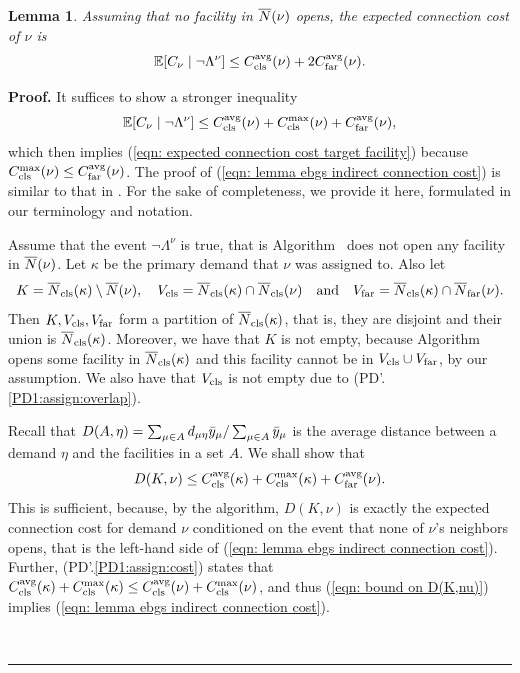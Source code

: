 \documentclass[oneside,final]{ucr}
\newtheorem{lemma}[theorem]{Lemma}
\newenvironment{proof}[1][Proof]{\textbf{#1.} }{\ \rule{0.5em}{0.5em}}
\begin{document}
\begin{lemma}\label{lem: EBGS target connection cost}
Assuming that no facility in ${\overline{N}}(\nu)$ opens, the expected connection
cost of $\nu$ is
%
\begin{equation}
  \mathbb{E}[C_{\nu} \mid \neg \Lambda^{\nu}] \leq
  C_{{\mbox{\scriptsize\rm cls}}}^{{\mbox{\scriptsize\rm avg}}}(\nu) + 2C_{{\mbox{\scriptsize\rm far}}}^{{\mbox{\scriptsize\rm avg}}}(\nu).
  \label{eqn: expected connection cost target facility}
\end{equation}
%
\end{lemma}
\begin{proof}
It suffices to show a stronger inequality
\begin{equation}
  \mathbb{E}[C_{\nu} \mid \neg \Lambda^{\nu}] \leq
  C_{{\mbox{\scriptsize\rm cls}}}^{{\mbox{\scriptsize\rm avg}}}(\nu) + C_{{\mbox{\scriptsize\rm cls}}}^{\max}(\nu) + C_{{\mbox{\scriptsize\rm far}}}^{{\mbox{\scriptsize\rm avg}}}(\nu)
			\label{eqn: lemma ebgs indirect connection cost},
\end{equation}
which then implies (\ref{eqn: expected connection cost
  target facility}) because $C_{{\mbox{\scriptsize\rm cls}}}^{\max}(\nu) \leq
C_{{\mbox{\scriptsize\rm far}}}^{{\mbox{\scriptsize\rm avg}}}(\nu)$.  The proof of (\ref{eqn: lemma ebgs indirect
  connection cost}) is similar to that in
\cite{ByrkaA10}. For the sake of completeness, we provide it
here, formulated in our terminology and notation.

Assume that the event $\neg \Lambda^{\nu}$ is true, that is Algorithm~{\EBGS}
does not open any facility in ${\overline{N}}(\nu)$.
Let $\kappa$ be the primary demand that $\nu$ was assigned to. Also let
\begin{equation*}
K = {\overline{N}}_{{\mbox{\scriptsize\rm cls}}}(\kappa) \setminus {\overline{N}}(\nu), \quad
V_{{\mbox{\scriptsize\rm cls}}} = {\overline{N}}_{{\mbox{\scriptsize\rm cls}}}(\kappa) \cap {\overline{N}}_{{\mbox{\scriptsize\rm cls}}}(\nu) \quad \textrm{and}\quad 
V_{{\mbox{\scriptsize\rm far}}} = {\overline{N}}_{{\mbox{\scriptsize\rm cls}}}(\kappa) \cap {\overline{N}}_{{\mbox{\scriptsize\rm far}}}(\nu).
\end{equation*}
% 
Then $K, V_{{\mbox{\scriptsize\rm cls}}}, V_{{\mbox{\scriptsize\rm far}}}$ form a partition of
${\overline{N}}_{{\mbox{\scriptsize\rm cls}}}(\kappa)$, that is, they are disjoint and their union is ${\overline{N}}_{{\mbox{\scriptsize\rm cls}}}(\kappa)$.
Moreover, we have that $K$ is not empty, because Algorithm~{\EBGS}
opens some facility in ${\overline{N}}_{{\mbox{\scriptsize\rm cls}}}(\kappa)$ and this facility cannot be in $V_{{\mbox{\scriptsize\rm cls}}}\cup V_{{\mbox{\scriptsize\rm far}}}$,
by our assumption. 
We also have that $V_{{\mbox{\scriptsize\rm cls}}}$ is not empty due to (PD'.\ref{PD1:assign:overlap}). 

Recall that $D(A,\eta) = \sum_{\mu\in A}d_{\mu\eta}{\bar y}_{\mu}/\sum_{\mu\in A}{\bar y}_{\mu}$
is the average distance between a demand $\eta$ and the facilities in a set $A$. We shall show that
%
\begin{equation}
	 D(K, \nu) \leq C_{{\mbox{\scriptsize\rm cls}}}^{{\mbox{\scriptsize\rm avg}}}(\kappa)+C_{{\mbox{\scriptsize\rm cls}}}^{\max}(\kappa) + C_{{\mbox{\scriptsize\rm far}}}^{{\mbox{\scriptsize\rm avg}}}(\nu).
				\label{eqn: bound on D(K,nu)}
\end{equation}
%
This is sufficient, because, by the algorithm, $D(K,\nu)$ is exactly 
the expected connection cost for demand $\nu$ conditioned on
the event that none of $\nu$'s neighbors 
opens, that is the left-hand side of (\ref{eqn: lemma ebgs indirect connection cost}).
Further, (PD'.\ref{PD1:assign:cost}) states that 
$C_{{\mbox{\scriptsize\rm cls}}}^{{\mbox{\scriptsize\rm avg}}}(\kappa)+C_{{\mbox{\scriptsize\rm cls}}}^{\max}(\kappa) \le C_{{\mbox{\scriptsize\rm cls}}}^{{\mbox{\scriptsize\rm avg}}}(\nu) + C_{{\mbox{\scriptsize\rm cls}}}^{\max}(\nu)$, and thus
(\ref{eqn: bound on D(K,nu)})  implies (\ref{eqn: lemma ebgs indirect connection cost}).


\end{proof}
\end{document}
